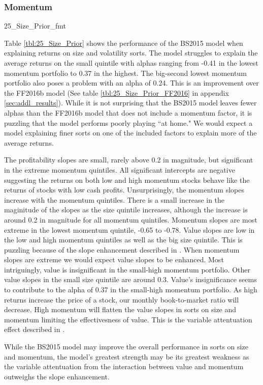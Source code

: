
\subsubsection{Momentum}

{25_Size_Prior_fmt}

Table \ref{tbl:25_Size_Prior} shows the performance of the BS2015 model when
explaining returns on size and volatility sorts. The model struggles to explain the
average returns on the small quintile with alphas ranging from -0.41 in the lowest
momentum portfolio to 0.37 in the highest. The big-second lowest momentum portfolio also
poses a problem with an alpha of 0.24. This is an improvement over the FF2016b model (See
table \ref{tbl:25_Size_Prior_FF2016} in appendix \ref{sec:addl_results}). While it is not
surprising that the BS2015 model leaves fewer alphas than the FF2016b model that does not
include a momentum factor, it is puzzling that the model performs poorly playing ``at
home." We would expect a model explaining finer sorts on one of the included factors to
explain more of the average returns.

The profitability slopes are small, rarely above 0.2 in magnitude, but significant in the
extreme momentum quintiles. All significant intercepts are negative suggesting the returns
on both low and high momentum stocks behave like the returns of stocks with low cash
profits. Unsurprisingly, the momentum slopes increase with the momentum quintiles. There
is a small increase in the maginitude of the slopes as the size quintile increases,
although the increase is around 0.2 in magnitude for all momentum quintiles. Momentum
slopes are most extreme in the lowest momentum quintile, -0.65 to -0.78. Value slopes are
low in the low and high momentum quintiles as well as the big size quintile. This is
puzzling because of the slope enhancement described in \textcite{fama2015incremental}.
When momentum slopes are extreme we would expect value slopes to be enhanced. Most
intriguingly, value is insignificant in the small-high momentum portfolio. Other value
slopes in the small size quintile are around 0.3. Value's insignificance seems to
contribute to the alpha of 0.37 in the small-high momentum portfolio. As high returns
increase the price of a stock, our monthly book-to-market ratio will decrease. High
momentum will flatten the value slopes in sorts on size and momentum limiting the
effectivesness of value. This is the variable attentuation effect described in
\textcite{fama2015incremental}.

While the BS2015 model may improve the overall performance in sorts on size and momentum,
the model's greatest strength may be its greatest weakness as the variable attentuation
from the interaction between value and momentum outweighs the slope enhancement.

